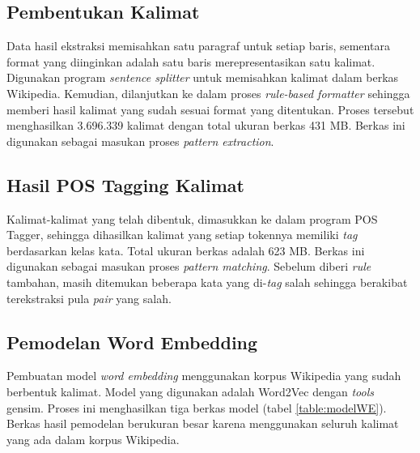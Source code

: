 \subsection{Pembentukan Kalimat}
Data hasil ekstraksi memisahkan satu paragraf untuk setiap baris, sementara format yang diinginkan adalah satu baris merepresentasikan satu kalimat. Digunakan program \textit{sentence splitter} untuk memisahkan kalimat dalam berkas Wikipedia. Kemudian, dilanjutkan ke dalam proses \textit{rule-based formatter} sehingga memberi hasil kalimat yang sudah sesuai format yang ditentukan. Proses tersebut menghasilkan 3.696.339 kalimat dengan total ukuran berkas 431 MB. Berkas ini digunakan sebagai masukan proses \textit{pattern extraction}. 

\subsection{Hasil POS Tagging Kalimat}
Kalimat-kalimat yang telah dibentuk, dimasukkan ke dalam program POS Tagger, sehingga dihasilkan kalimat yang setiap tokennya memiliki \textit{tag} berdasarkan kelas kata. Total ukuran berkas adalah 623 MB. Berkas ini digunakan sebagai masukan proses \textit{pattern matching}. Sebelum diberi \textit{rule} tambahan, masih ditemukan beberapa kata yang di-\textit{tag} salah sehingga berakibat terekstraksi pula \textit{pair} yang salah. 

\subsection{Pemodelan Word Embedding}
Pembuatan model \textit{word embedding} menggunakan korpus Wikipedia yang sudah berbentuk kalimat. Model yang digunakan adalah Word2Vec dengan \textit{tools} gensim. Proses ini menghasilkan tiga berkas model (tabel \ref{table:modelWE}). Berkas hasil pemodelan berukuran besar karena menggunakan seluruh kalimat yang ada dalam korpus Wikipedia.

